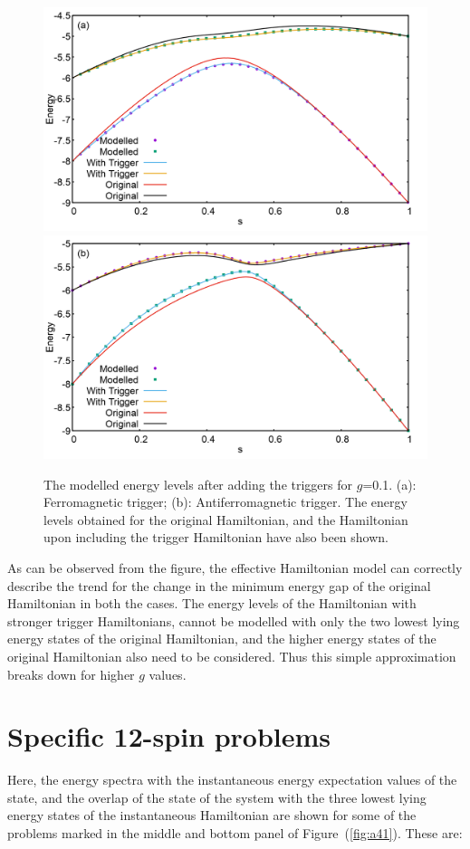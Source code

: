 \documentclass[../main.tex]{subfiles}
\begin{document}
\begin{appendices}
\begin{figure}
\centering 
\includegraphics[scale=0.2]{98_Ferro_g0.png}
\includegraphics[scale=0.2]{59_antiFerro_g0.png}
\caption{The modelled energy levels after adding the triggers for $g$=0.1. (a): Ferromagnetic trigger; (b): Antiferromagnetic trigger. The energy levels obtained for the original Hamiltonian, and the Hamiltonian upon including the trigger Hamiltonian have also been shown.}
\label{fig:ap8}
\end{figure}
As can be observed from the figure, the effective Hamiltonian model can correctly describe the trend for the change in the minimum energy gap of the original Hamiltonian in both the cases. The energy levels of the Hamiltonian with stronger trigger Hamiltonians, cannot be modelled with only the two lowest lying energy states of the original Hamiltonian, and the higher energy states of the original Hamiltonian also need to be considered. Thus this simple approximation breaks down for higher $g$ values.
\section{Specific 12-spin problems}
Here, the energy spectra with the instantaneous energy expectation values of the state, and the overlap of the state of the system with the three lowest lying energy states of the instantaneous Hamiltonian are shown for some of the problems marked in the middle and bottom panel of Figure~(\ref{fig:a41}). These are:


\end{appendices}
\end{document}
